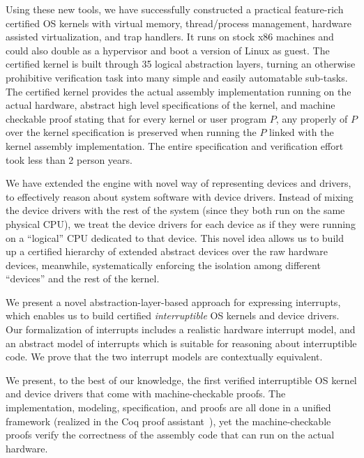 \begin{itemize}
{\item Using these new tools, we have successfully constructed a
practical feature-rich certified OS kernels with virtual memory,
thread/process management, hardware assisted virtualization,
and trap handlers. It runs on stock x86 machines
and could also double as a hypervisor and boot a version of Linux as guest.
The certified kernel is built through 35 logical
abstraction layers, turning
an otherwise prohibitive verification task into many simple
and easily automatable sub-tasks.
The certified
kernel provides the actual assembly implementation running on the
actual hardware, abstract high level specifications of the kernel,
and machine checkable proof stating that for every kernel or user
program $P$, any properly of $P$ over the kernel specification
is preserved when running the $P$ linked with the kernel assembly
implementation.  The entire specification and verification
effort took less than 2 person years.
}

\item We have extended the engine with novel way of representing
devices and drivers, to effectively reason about system software
with device drivers.
Instead of mixing the device drivers
  with the rest of the system (since they both run on the same
  physical CPU), we treat the device drivers for each device as if
  they were running on a ``logical'' CPU dedicated to that device.
  This novel idea allows us to build up a certified hierarchy of
  extended abstract devices over the raw hardware devices, meanwhile,
  systematically enforcing the isolation among different ``devices''
  and the rest of the kernel.

\item We present a novel abstraction-layer-based approach for
  expressing interrupts, which enables us to build certified
  {\em interruptible} OS kernels and device drivers. Our formalization of
  interrupts includes a realistic hardware interrupt model, and an
  abstract model of interrupts which is suitable for reasoning about
  interruptible code. We prove that the two interrupt models are
  contextually equivalent.

\item We present, to the best of our knowledge, the first verified
  interruptible OS kernel and device drivers that come with
  machine-checkable proofs.  The implementation, modeling, specification, and
  proofs are all done in a unified framework (realized in the Coq
  proof assistant~\cite{coq}), yet the machine-checkable proofs verify the
  correctness of the assembly code that can run on the actual
  hardware.
  

\end{itemize}
